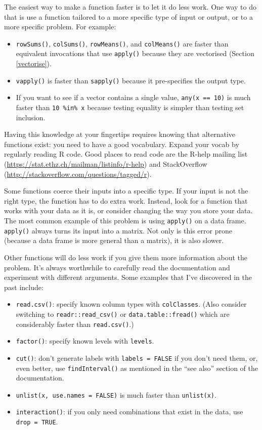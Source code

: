 \documentclass[]{book}
\renewcommand{\href}[2]{#2 (\url{#1})}
\begin{document}
The easiest way to make a function faster is to let it do less work. One way to do that is use a function tailored to a more specific type of input or output, or to a more specific problem. For example:

\begin{itemize}
\item
  \texttt{rowSums()}, \texttt{colSums()}, \texttt{rowMeans()}, and \texttt{colMeans()} are faster than
  equivalent invocations that use \texttt{apply()} because they are vectorised
  (Section \ref{vectorise}).
\item
  \texttt{vapply()} is faster than \texttt{sapply()} because it pre-specifies the output
  type.
\item
  If you want to see if a vector contains a single value, \texttt{any(x\ ==\ 10)}
  is much faster than \texttt{10\ \%in\%\ x} because testing equality is simpler
  than testing set inclusion.
\end{itemize}

Having this knowledge at your fingertips requires knowing that alternative functions exist: you need to have a good vocabulary. Expand your vocab by regularly reading R code. Good places to read code are the \href{https://stat.ethz.ch/mailman/listinfo/r-help}{R-help mailing list} and \href{http://stackoverflow.com/questions/tagged/r}{StackOverflow}.

Some functions coerce their inputs into a specific type. If your input is not the right type, the function has to do extra work. Instead, look for a function that works with your data as it is, or consider changing the way you store your data. The most common example of this problem is using \texttt{apply()} on a data frame. \texttt{apply()} always turns its input into a matrix. Not only is this error prone (because a data frame is more general than a matrix), it is also slower.

Other functions will do less work if you give them more information about the problem. It's always worthwhile to carefully read the documentation and experiment with different arguments. Some examples that I've discovered in the past include:

\begin{itemize}
\item
  \texttt{read.csv()}: specify known column types with \texttt{colClasses}. (Also consider
  switching to \texttt{readr::read\_csv()} or \texttt{data.table::fread()} which are
  considerably faster than \texttt{read.csv()}.)
\item
  \texttt{factor()}: specify known levels with \texttt{levels}.
\item
  \texttt{cut()}: don't generate labels with \texttt{labels\ =\ FALSE} if you don't need them,
  or, even better, use \texttt{findInterval()} as mentioned in the ``see also'' section
  of the documentation.
\item
  \texttt{unlist(x,\ use.names\ =\ FALSE)} is much faster than \texttt{unlist(x)}.
\item
  \texttt{interaction()}: if you only need combinations that exist in the data, use
  \texttt{drop\ =\ TRUE}.
\end{itemize}
\end{document}
